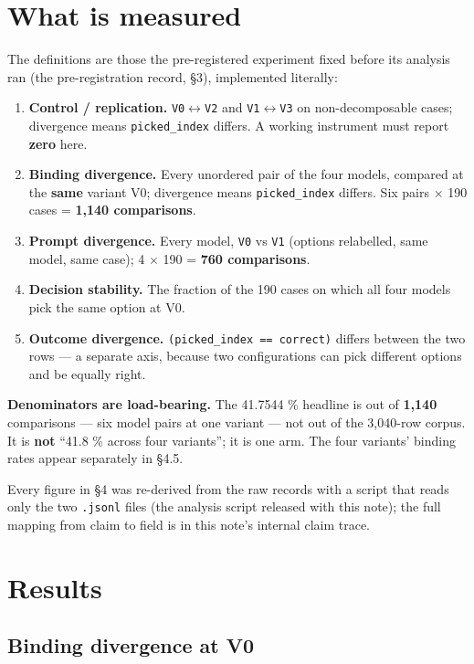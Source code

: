 \documentclass[10pt]{article}
\begin{document}
\section{What is measured}

The definitions are those the pre-registered experiment fixed before its analysis ran (the pre-registration record, \S3), implemented literally:

\begin{enumerate}
\item \textbf{Control / replication.} \texttt{V0}$\leftrightarrow$\texttt{V2} and \texttt{V1}$\leftrightarrow$\texttt{V3} on non-decomposable cases; divergence means \texttt{picked\_index} differs. A working instrument must report \textbf{zero} here.
\item \textbf{Binding divergence.} Every unordered pair of the four models, compared at the \textbf{same} variant V0; divergence means \texttt{picked\_index} differs. Six pairs $\times$ 190 cases = \textbf{1,140 comparisons}.
\item \textbf{Prompt divergence.} Every model, \texttt{V0} vs \texttt{V1} (options relabelled, same model, same case); 4 $\times$ 190 = \textbf{760 comparisons}.
\item \textbf{Decision stability.} The fraction of the 190 cases on which all four models pick the same option at V0.
\item \textbf{Outcome divergence.} \texttt{(picked\_index == correct)} differs between the two rows --- a separate axis, because two configurations can pick different options and be equally right.
\end{enumerate}

\textbf{Denominators are load-bearing.} The 41.7544 \% headline is out of \textbf{1,140} comparisons --- six model pairs at one variant --- not out of the 3,040-row corpus. It is \textbf{not} ``41.8 \% across four variants''; it is one arm. The four variants' binding rates appear separately in \S4.5.

Every figure in \S4 was re-derived from the raw records with a script that reads only the two \texttt{.jsonl} files (the analysis script released with this note); the full mapping from claim to field is in this note's internal claim trace.

\section{Results}

\subsection{Binding divergence at V0}
\end{document}
